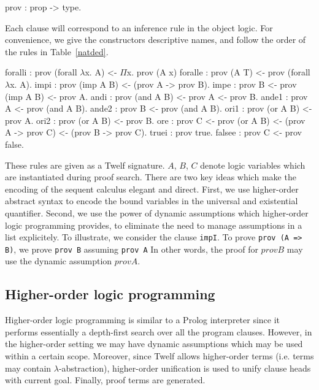 \documentclass{acmconf}
\newcommand{\z}{\mbox{}}
\begin{document}
\begin{code}
prov : prop -> type.
\end{code}

Each clause will correspond to an inference rule in the object
logic. For convenience, we give the constructors 
descriptive names, and follow the order of the rules in
Table~\ref{natded}. 

\begin{code}
foralli   : prov (forall $\lambda$x. A)
            <- $\Pi$x. prov (A x)
foralle   : prov (A T)
            <- prov (forall $\lambda$x. A).
\z
impi     : prov (imp A B)
            <- (prov A -> prov B).
impe     : prov B
            <- prov (imp A B)
            <- prov A.
\z
andi     : prov (and A B)
            <- prov A
            <- prov B.
ande1    : prov A
            <- prov (and A B).
ande2    : prov B
            <- prov (and A B).
\z
ori1     : prov (or A B)
            <- prov A.
ori2     : prov (or A B)
            <- prov B.
ore      : prov C
            <- prov (or A B)
            <- (prov A -> prov C)
            <- (prov B -> prov C).
\z
truei    : prov true.
\z
falsee   : prov C
            <- prov false.
\end{code}

These rules are given as a Twelf signature. $A$, $B$, $C$ denote logic
variables which are instantiated during proof search. 
There are two key ideas which make the encoding of the sequent
calculus elegant and direct. First, we use higher-order abstract
syntax to encode the bound variables in the universal and existential
quantifier. Second, we use the power of dynamic assumptions which
higher-order logic programming provides, to eliminate the need to
manage assumptions in a list explicitely. To illustrate, we consider the
clause {\tt impI}. To  prove {\tt prov (A => B)}, we prove {\tt prov B}
assuming {\tt prov A} In other words, the proof for $prov B$ may use
the dynamic assumption $prov A$. 

\subsection{Higher-order logic programming}

Higher-order logic programming is similar to a Prolog interpreter
since it performs essentially a depth-first search over all the
program clauses. However, in the higher-order setting we may have
dynamic assumptions which may be used within a certain
scope. Moreover, since Twelf allows higher-order terms (i.e. terms may
contain $\lambda$-abstraction), higher-order unification is used to
unify clause heads with current goal. Finally, proof terms are
generated.
\end{document}
